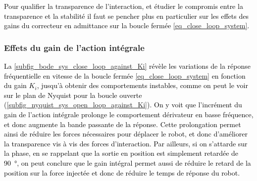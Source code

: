 %
%


\textcolor{black}{Pour qualifier la transparence de l'interaction, et étudier le compromis entre la transparence et la stabilité \parencite{ajoudani_progress_2018} il faut se pencher plus en particulier sur les effets des gains du correcteur en admittance sur la boucle fermée \cref{eq_close_loop_system}.}

\subsubsection{Effets du gain de l'action intégrale}

\textcolor{black}{La \cref{subfig_bode_sys_close_loop_against_Ki} révèle les variations de la réponse fréquentielle en vitesse de la boucle fermée \cref{eq_close_loop_system} en fonction du gain $K_i$, jusqu'à obtenir des comportements instables, comme on peut le voir sur le plan de Nyquist pour la boucle ouverte (\cref{subfig_nyquist_sys_open_loop_against_Ki}). On y voit que l'incrément du gain de l'action intégrale prolonge le comportement dérivateur en basse fréquence, et donc augmente la bande passante de la réponse. Cette prolongation permet ainsi de réduire les forces nécessaires pour déplacer le robot, et donc d'améliorer la transparence vis à vis des forces d'interaction. Par ailleurs, si on s'attarde sur la phase, en se rappelant que la sortie en position est simplement retardée de \SI{90}{\degree}, on peut conclure que le gain intégral permet aussi de réduire le retard de la position sur la force injectée et donc de réduire le temps de réponse du robot.}

